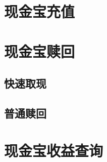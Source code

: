 
\section{现金宝充值} 
\label{sec:trade_mac_recharge}


\section{现金宝赎回} 
\label{sec:trade_redemp}

\subsection{快速取现} 
\label{sub:trade_mac_quick_redemp}


\subsection{普通赎回} 
\label{sub:trade_mac_normal_redemp}


\section{现金宝收益查询} 
\label{sec:trade_mac_record}

